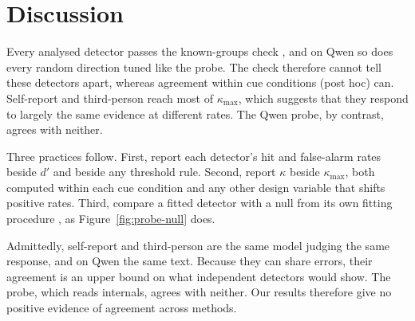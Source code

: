 \section{Discussion}
\label{sec:discussion}

Every analysed detector passes the known-groups check \citep{hattie1984procedures}, and on Qwen so
does every random direction tuned like the probe. The check therefore cannot tell these
detectors apart, whereas agreement within cue conditions (post hoc) can. Self-report and
third-person reach most of $\kappa_{\max}$, which suggests that they respond to largely the same
evidence at different rates. The Qwen probe, by contrast, agrees with neither.

Three practices follow. First, report each detector's hit and false-alarm rates beside $d'$ and
beside any threshold rule. Second, report $\kappa$ beside $\kappa_{\max}$, both computed within
each cue condition and any other design variable that shifts positive rates. Third, compare a
fitted detector with a null from its own fitting procedure \citep{hewitt2019designing}, as
Figure~\ref{fig:probe-null} does.

Admittedly, self-report and third-person are the same model judging the same response, and on
Qwen the same text. Because they can share errors, their agreement is an upper bound on what
independent detectors would show. The probe, which reads internals, agrees with neither. Our
results therefore give no positive evidence of agreement across methods.
